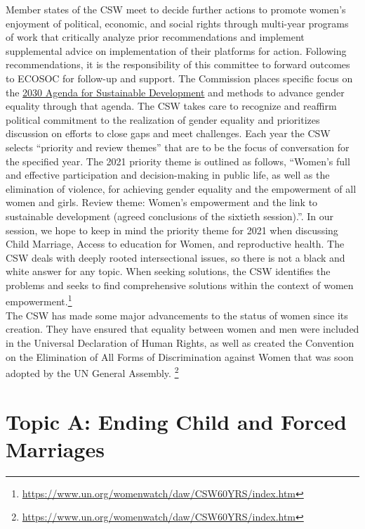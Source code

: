 \documentclass[10pt, letterpaper]{article}
\begin{document}
Member states of the CSW meet to decide further actions to promote
women's enjoyment of political, economic, and social rights through
multi-year programs of work that critically analyze prior
recommendations and implement supplemental advice on implementation of
their platforms for action. Following recommendations, it is the
responsibility of this committee to forward outcomes to ECOSOC for
follow-up and support. The Commission places specific focus on the
\href{https://www.unwomen.org/en/what-we-do/2030-agenda-for-sustainable-development}{{2030
Agenda for Sustainable Development}} and methods to advance gender
equality through that agenda. The CSW takes care to recognize and
reaffirm political commitment to the realization of gender equality and
prioritizes discussion on efforts to close gaps and meet challenges.
Each year the CSW selects ``priority and review themes'' that are to be
the focus of conversation for the specified year. The 2021 priority
theme is outlined as follows, ``Women's full and effective participation
and decision-making in public life, as well as the elimination of
violence, for achieving gender equality and the empowerment of all women
and girls. Review theme: Women's empowerment and the link to sustainable
development (agreed conclusions of the sixtieth session).''. In our
session, we hope to keep in mind the priority theme for 2021 when
discussing Child Marriage, Access to education for Women, and
reproductive health. The CSW deals with deeply rooted intersectional
issues, so there is not a black and white answer for any topic. When
seeking solutions, the CSW identifies the problems and seeks to find
comprehensive solutions within the context of women
empowerment.\footnote{\href{https://www.un.org/womenwatch/daw/CSW60YRS/index.htm}{{https://www.un.org/womenwatch/daw/CSW60YRS/index.htm}}} \\

The CSW has made some major advancements to the status of women since
its creation. They have ensured that equality between women and men were
included in the Universal Declaration of Human Rights, as well as
created the Convention on the Elimination of All Forms of Discrimination
against Women that was soon adopted by the UN General Assembly.
\footnote{\href{https://www.un.org/womenwatch/daw/CSW60YRS/index.htm}{{https://www.un.org/womenwatch/daw/CSW60YRS/index.htm}}} \\

\newpage
\section{Topic A: Ending Child and Forced Marriages}
\end{document}
